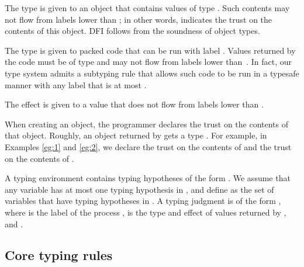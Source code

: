 \documentclass{sigplanconf}
\newenvironment{compact}
        {\begin{list}{}{
}}
        {\end{list}}
\begin{document}
\begin{compact}
\item The type  is given to an object that
  contains values of type . Such contents may not flow from labels lower than ; in other words,  indicates the trust on the contents of this object. DFI follows from the soundness of object types.
\item The type  is given to packed
  code that can be run with label . Values returned by the code must be of type  and
  may not flow from labels lower than~. In fact, our type system admits a subtyping rule that allows such code to be run in a typesafe manner with any label that is at most .
\item The effect  is given to a value that does not flow from labels lower than . 
\end{compact}
When creating an object, the programmer declares the trust on the contents of that object. 
Roughly, an object returned by  gets a type .
For example, in Examples \ref{eg:1} and \ref{eg:2}, we declare the trust  on the contents of  and the trust  on the contents of .

A typing environment  contains 
typing hypotheses of the form . We assume that any variable has at most one typing hypothesis in , and define  as the set of variables that have
typing hypotheses in . 
A typing judgment is of the
form , where  is the label of the process ,  is the type and effect of values returned by , and  .


\subsection{Core typing rules}\label{core}
\end{document}
